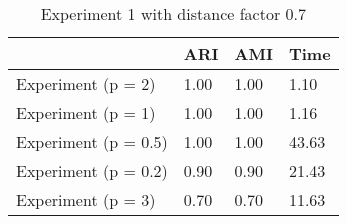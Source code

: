 \begin{table}
\centering
\caption{Experiment 1 with distance factor 0.7}
\begin{tabular}{llll}
\toprule
{} &   ARI &   AMI &   Time \\
\midrule
Experiment (p = 2)   &  1.00 &  1.00 &   1.10 \\
Experiment (p = 1)   &  1.00 &  1.00 &   1.16 \\
Experiment (p = 0.5) &  1.00 &  1.00 &  43.63 \\
Experiment (p = 0.2) &  0.90 &  0.90 &  21.43 \\
Experiment (p = 3)   &  0.70 &  0.70 &  11.63 \\
\bottomrule
\end{tabular}
\end{table}
